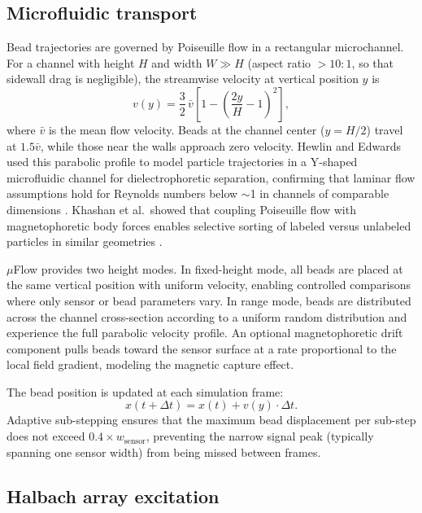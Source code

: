 \documentclass[preprint,review,12pt]{elsarticle}
\begin{document}
\subsection{Microfluidic transport}
\label{sec:transport}

Bead trajectories are governed by Poiseuille flow in a rectangular microchannel. For a channel with height $H$ and width $W \gg H$ (aspect ratio ${>}10{:}1$, so that sidewall drag is negligible), the streamwise velocity at vertical position $y$ is
\begin{equation}
v(y) = \frac{3}{2}\,\bar{v}\left[1 - \left(\frac{2y}{H} - 1\right)^2\right],
\label{eq:poiseuille}
\end{equation}
where $\bar{v}$ is the mean flow velocity. Beads at the channel center ($y = H/2$) travel at $1.5\bar{v}$, while those near the walls approach zero velocity. Hewlin and Edwards used this parabolic profile to model particle trajectories in a Y-shaped microfluidic channel for dielectrophoretic separation, confirming that laminar flow assumptions hold for Reynolds numbers below ${\sim}$1 in channels of comparable dimensions \cite{hewlin2023}. Khashan et al.\ showed that coupling Poiseuille flow with magnetophoretic body forces enables selective sorting of labeled versus unlabeled particles in similar geometries \cite{khashan2024}.

$\mu$Flow provides two height modes. In fixed-height mode, all beads are placed at the same vertical position with uniform velocity, enabling controlled comparisons where only sensor or bead parameters vary. In range mode, beads are distributed across the channel cross-section according to a uniform random distribution and experience the full parabolic velocity profile. An optional magnetophoretic drift component pulls beads toward the sensor surface at a rate proportional to the local field gradient, modeling the magnetic capture effect.

The bead position is updated at each simulation frame:
\begin{equation}
x(t + \Delta t) = x(t) + v(y) \cdot \Delta t.
\label{eq:advection}
\end{equation}
Adaptive sub-stepping ensures that the maximum bead displacement per sub-step does not exceed $0.4 \times w_{\text{sensor}}$, preventing the narrow signal peak (typically spanning one sensor width) from being missed between frames.

\subsection{Halbach array excitation}
\label{sec:halbach}
\end{document}
